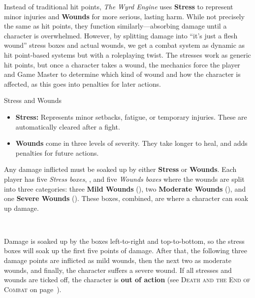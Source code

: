 Instead of traditional hit points, \emph{The Wyrd Engine} uses \textbf{Stress} to represent minor injuries and \textbf{Wounds} for more serious, lasting harm. While not precisely the same as hit points, they function similarly—absorbing damage until a character is overwhelmed. However, by splitting damage into ``it's just a flesh wound'' stress boxes and actual wounds, we get a combat system as dynamic as hit point-based systems but with a roleplaying twist. The stresses work as generic hit points, but once a character takes a wound, the mechanics force the player and Game Master to determine which kind of wound and how the character is affected, as this goes into penalties for later actions.

\begin{DndReadAloud}{Stress and Wounds}
	\begin{itemize}
    	\item \textbf{Stress:} Represents minor setbacks, fatigue, or temporary injuries. These are automatically cleared after a fight.
	    \item \textbf{Wounds} come in three levels of severity. They take longer to heal, and adds penalties for future actions.
	\end{itemize}
\end{DndReadAloud}

Any damage inflicted must be soaked up by either \textbf{Stress} or \textbf{Wounds}. Each player has five \emph{Stress boxes}, \StressBoxes, and five \emph{Wounds boxes} where the wounds are split into three categories: three \textbf{Mild Wounds} (\MildWounds), two \textbf{Moderate Wounds} (\ModerateWounds), and one \textbf{Severe Wounds} (\SevereWounds). These boxes, combined, are where a character can soak up damage.

\begin{DndReadAloud}{}
	\\
	\Damage
\end{DndReadAloud}

Damage is soaked up by the boxes left-to-right and top-to-bottom, so the stress boxes will soak up the first five points of damage. After that, the following three damage points are inflicted as mild wounds, then the next two as moderate wounds, and finally, the character suffers a severe wound. If all stresses and wounds are ticked off, the character is \textbf{out of action} (see \textsc{Death and the End of Combat} on page~).

